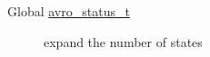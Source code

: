 \label{todo__todo000001}
\hypertarget{todo__todo000001}{}
 \begin{description}
\item[Global \hyperlink{group___handle___routines_g4271ca78aabaaad628d7b632aa5a1499}{avro\_\-status\_\-t} ]expand the number of states \end{description}
